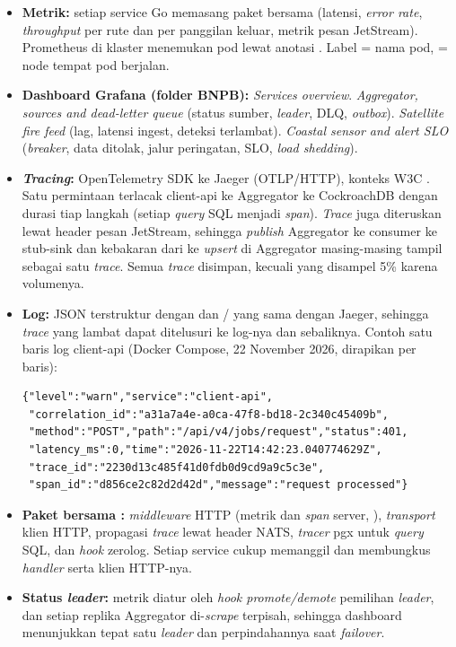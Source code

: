 \begin{itemize}
\item \textbf{Metrik:} setiap service Go memasang paket bersama  (latensi, \textit{error rate}, \textit{throughput} per rute dan per panggilan keluar, metrik pesan JetStream). Prometheus di klaster menemukan pod lewat anotasi . Label  = nama pod,  = node tempat pod berjalan.
\item \textbf{Dashboard Grafana (folder BNPB):} \textit{Services overview}. \textit{Aggregator, sources and dead-letter queue} (status sumber, \textit{leader}, DLQ, \textit{outbox}). \textit{Satellite fire feed} (lag, latensi ingest, deteksi terlambat). \textit{Coastal sensor and alert SLO} (\textit{breaker}, data ditolak, jalur peringatan, SLO, \textit{load shedding}).
\item \textbf{\textit{Tracing}:} OpenTelemetry SDK ke Jaeger (OTLP/HTTP), konteks W3C . Satu permintaan terlacak client-api ke Aggregator ke CockroachDB dengan durasi tiap langkah (setiap \textit{query} SQL menjadi \textit{span}). \textit{Trace} juga diteruskan lewat header pesan JetStream, sehingga \textit{publish} Aggregator ke consumer ke stub-sink dan kebakaran dari  ke \textit{upsert} di Aggregator masing-masing tampil sebagai satu \textit{trace}. Semua \textit{trace} disimpan, kecuali  yang disampel 5\% karena volumenya.
\item \textbf{Log:} JSON terstruktur dengan  dan / yang sama dengan Jaeger, sehingga \textit{trace} yang lambat dapat ditelusuri ke log-nya dan sebaliknya. Contoh satu baris log client-api (Docker Compose, 22 November 2026, dirapikan per baris):
\begin{lstlisting}
{"level":"warn","service":"client-api",
 "correlation_id":"a31a7a4e-a0ca-47f8-bd18-2c340c45409b",
 "method":"POST","path":"/api/v4/jobs/request","status":401,
 "latency_ms":0,"time":"2026-11-22T14:42:23.040774629Z",
 "trace_id":"2230d13c485f41d0fdb0d9cd9a9c5c3e",
 "span_id":"d856ce2c82d2d42d","message":"request processed"}
\end{lstlisting}
\item \textbf{Paket bersama :} \textit{middleware} HTTP (metrik dan \textit{span} server, ), \textit{transport} klien HTTP, propagasi \textit{trace} lewat header NATS, \textit{tracer} pgx untuk \textit{query} SQL, dan \textit{hook} zerolog. Setiap service cukup memanggil  dan membungkus \textit{handler} serta klien HTTP-nya.
\item \textbf{Status \textit{leader}:} metrik  diatur oleh \textit{hook promote/demote} pemilihan \textit{leader}, dan setiap replika Aggregator di-\textit{scrape} terpisah, sehingga dashboard menunjukkan tepat satu \textit{leader} dan perpindahannya saat \textit{failover}.
\end{itemize}

